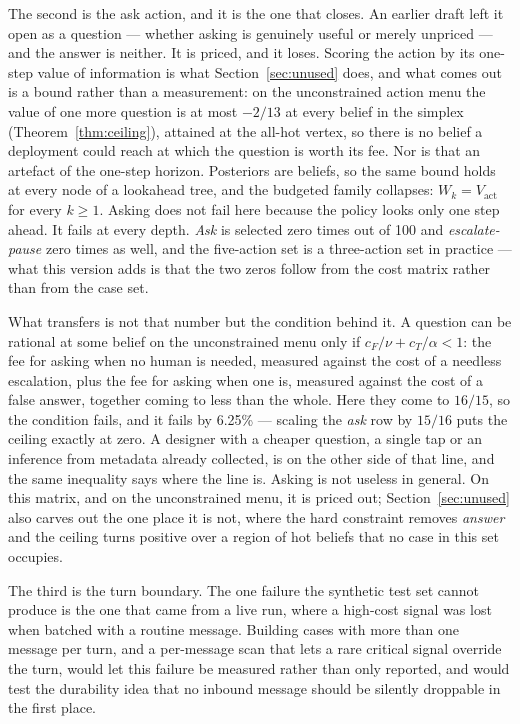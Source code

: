 \documentclass{article}
\begin{document}
The second is the ask action, and it is the one that closes. An earlier draft left
it open as a question --- whether asking is genuinely useful or merely unpriced ---
and the answer is neither. It is priced, and it loses. Scoring the action by its
one-step value of information is what Section~\ref{sec:unused} does, and what comes
out is a bound rather than a measurement: on the unconstrained action menu the value
of one more question is at most $-2/13$ at every belief in the simplex
(Theorem~\ref{thm:ceiling}), attained at the all-hot vertex, so there is no belief a
deployment could reach at which the question is worth its fee. Nor is that an
artefact of the one-step horizon. Posteriors are beliefs, so the same bound holds at
every node of a lookahead tree, and the budgeted family collapses:
$W_k = V_{\mathrm{act}}$ for every $k \ge 1$. Asking does not fail here because the
policy looks only one step ahead. It fails at every depth. \emph{Ask} is selected
zero times out of 100 and \emph{escalate-pause} zero times as well, and the
five-action set is a three-action set in practice --- what this version adds is that
the two zeros follow from the cost matrix rather than from the case set.

What transfers is not that number but the condition behind it. A question can be
rational at some belief on the unconstrained menu only if
$c_F/\nu + c_T/\alpha < 1$: the fee for asking when no human is needed, measured
against the cost of a needless escalation, plus the fee for asking when one is,
measured against the cost of a false answer, together coming to less than the whole.
Here they come to $16/15$, so the condition fails, and it fails by 6.25\% ---
scaling the \emph{ask} row by $15/16$ puts the ceiling exactly at zero. A designer
with a cheaper question, a single tap or an inference from metadata already
collected, is on the other side of that line, and the same inequality says where the
line is. Asking
is not useless in general. On this matrix, and on the unconstrained menu, it is
priced out; Section~\ref{sec:unused} also carves out the one place it is not, where
the hard constraint removes \emph{answer} and the ceiling turns positive over a
region of hot beliefs that no case in this set occupies.

The third is the turn boundary. The one failure the synthetic test set cannot
produce is the one that came from a live run, where a high-cost signal was lost
when batched with a routine message. Building cases with more than one message per
turn, and a per-message scan that lets a rare critical signal override the turn,
would let this failure be measured rather than only reported, and would test the
durability idea that no inbound message should be silently droppable in the first
place.
\end{document}
